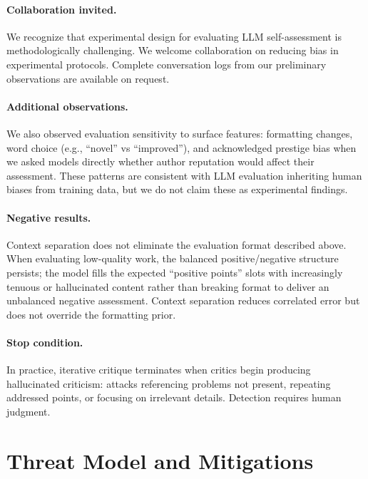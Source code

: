 \documentclass[11pt]{article}
\begin{document}
\paragraph{Collaboration invited.} We recognize that experimental design for evaluating LLM
self-assessment is methodologically challenging. We welcome collaboration on reducing bias
in experimental protocols. Complete conversation logs from our preliminary observations are
available on request.

\paragraph{Additional observations.} We also observed evaluation sensitivity to surface
features: formatting changes, word choice (e.g., ``novel'' vs ``improved''), and
acknowledged prestige bias when we asked models directly whether author reputation would
affect their assessment. These patterns are consistent with LLM evaluation inheriting human
biases from training data, but we do not claim these as experimental findings.

\paragraph{Negative results.} Context separation does not eliminate the evaluation format
described above. When evaluating low-quality work, the balanced positive/negative structure
persists; the model fills the expected ``positive points'' slots with increasingly tenuous
or hallucinated content rather than breaking format to deliver an unbalanced negative
assessment. Context separation reduces correlated error but does not override the formatting
prior.

\paragraph{Stop condition.} In practice, iterative critique terminates when critics begin
producing hallucinated criticism: attacks referencing problems not present, repeating
addressed points, or focusing on irrelevant details. Detection requires human judgment.

\section{Threat Model and Mitigations}
\end{document}
